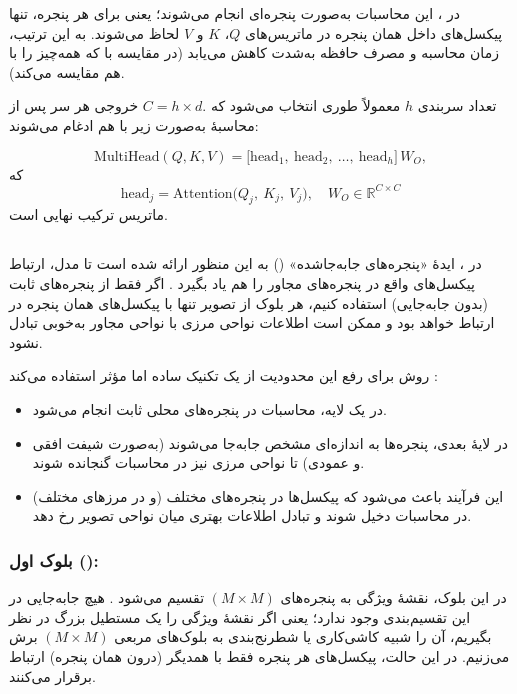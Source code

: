 در \textbf{}، این محاسبات به‌صورت پنجره‌ای انجام می‌شوند؛ یعنی 
برای هر پنجره، تنها پیکسل‌های داخل همان پنجره در ماتریس‌های 
\(\displaystyle Q\)، \(\displaystyle K\) و \(\displaystyle V\) لحاظ می‌شوند. 
به این ترتیب، زمان محاسبه و مصرف حافظه به‌شدت کاهش می‌یابد 
(در مقایسه با \textbf{} که همه‌چیز را با هم مقایسه می‌کند).

تعداد سربندی \(\displaystyle h\) معمولاً طوری انتخاب می‌شود که 
\(\displaystyle C = h \times d.\) 
خروجی هر سر پس از محاسبهٔ  به‌صورت زیر با هم ادغام می‌شوند:

\[
\mathrm{MultiHead}(Q,K,V) 
= 
\bigl[\text{head}_1,\ \text{head}_2,\ \dots,\ \text{head}_h\bigr]\,
W_O,
\]
که 
\[
\text{head}_j = \mathrm{Attention}\bigl(Q_j,\ K_j,\ V_j\bigr),
\quad 
W_O \in \mathbb{R}^{C \times C}
\]
ماتریس ترکیب نهایی است.

\subsection{}

در \textbf{}، ایدهٔ «پنجره‌های جابه‌جاشده» (\textit{})
به این منظور ارائه شده است تا مدل، ارتباط پیکسل‌های واقع در پنجره‌های مجاور را هم یاد بگیرد \cite{liu2021swintransformer}.
اگر فقط از پنجره‌های ثابت (بدون جابه‌جایی) استفاده کنیم، هر بلوک از تصویر تنها با پیکسل‌های همان 
پنجره در ارتباط خواهد بود و ممکن است اطلاعات نواحی مرزی با نواحی مجاور به‌خوبی تبادل نشود.

روش \textbf{} برای رفع این محدودیت از یک تکنیک ساده اما مؤثر استفاده می‌کند \cite{liu2021swintransformer}:
\begin{itemize}
	\item در یک لایه، محاسبات  در پنجره‌های محلی ثابت انجام می‌شود.
	\item در لایهٔ بعدی، پنجره‌ها به اندازه‌ای مشخص جابه‌جا می‌شوند (به‌صورت شیفت افقی و عمودی) 
	تا نواحی مرزی نیز در محاسبات گنجانده شوند.
	\item این فرآیند باعث می‌شود که پیکسل‌ها در پنجره‌های مختلف (و در مرزهای مختلف) 
	در محاسبات دخیل شوند و تبادل اطلاعات بهتری میان نواحی تصویر رخ دهد.
\end{itemize}

\subsubsection{بلوک اول ():}
در این بلوک، نقشهٔ ویژگی به پنجره‌های \(\displaystyle (M \times M)\) تقسیم می‌شود \cite{liu2021swintransformer}.
هیچ جابه‌جایی در این تقسیم‌بندی وجود ندارد؛ یعنی اگر نقشهٔ ویژگی را یک مستطیل بزرگ در نظر بگیریم،
آن را شبیه کاشی‌کاری یا شطرنج‌بندی به بلوک‌های مربعی \(\displaystyle (M \times M)\) برش می‌زنیم.
در این حالت، پیکسل‌های هر پنجره فقط با همدیگر (درون همان پنجره) ارتباط برقرار می‌کنند.


